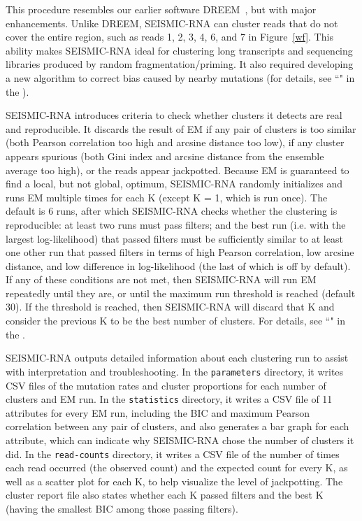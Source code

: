 \documentclass[unnumsec,webpdf,contemporary,large]{oup-authoring-template}%
\theoremstyle{thmstyleone}%
\theoremstyle{thmstyletwo}%
\theoremstyle{thmstylethree}%
\begin{document}
This procedure resembles our earlier software DREEM~\cite{Tomezsko2020}, but with major enhancements.
Unlike DREEM, SEISMIC-RNA can cluster reads that do not cover the entire region, such as reads 1, 2, 3, 4, 6, and 7 in Figure~\ref{wf}.
This ability makes SEISMIC-RNA ideal for clustering long transcripts and sequencing libraries produced by random fragmentation/priming.
It also required developing a new algorithm to correct bias caused by nearby mutations (for details, see ``" in the ).

SEISMIC-RNA introduces criteria to check whether clusters it detects are real and reproducible.
It discards the result of EM if any pair of clusters is too similar (both Pearson correlation too high and arcsine distance too low), if any cluster appears spurious (both Gini index and arcsine distance from the ensemble average too high), or the reads appear jackpotted.
Because EM is guaranteed to find a local, but not global, optimum, SEISMIC-RNA randomly initializes and runs EM multiple times for each K (except K = 1, which is run once).
The default is 6 runs, after which SEISMIC-RNA checks whether the clustering is reproducible: at least two runs must pass filters; and the best run (i.e. with the largest log-likelihood) that passed filters must be sufficiently similar to at least one other run that passed filters in terms of high Pearson correlation, low arcsine distance, and low difference in log-likelihood (the last of which is off by default).
If any of these conditions are not met, then SEISMIC-RNA will run EM repeatedly until they are, or until the maximum run threshold is reached (default 30).
If the threshold is reached, then SEISMIC-RNA will discard that K and consider the previous K to be the best number of clusters.
For details, see ``" in the .

SEISMIC-RNA outputs detailed information about each clustering run to assist with interpretation and troubleshooting.
In the \verb|parameters| directory, it writes CSV files of the mutation rates and cluster proportions for each number of clusters and EM run.
In the \verb|statistics| directory, it writes a CSV file of 11 attributes for every EM run, including the BIC and maximum Pearson correlation between any pair of clusters, and also generates a bar graph for each attribute, which can indicate why SEISMIC-RNA chose the number of clusters it did.
In the \verb|read-counts| directory, it writes a CSV file of the number of times each read occurred (the observed count) and the expected count for every K, as well as a scatter plot for each K, to help visualize the level of jackpotting.
The cluster report file also states whether each K passed filters and the best K (having the smallest BIC among those passing filters).
\end{document}
